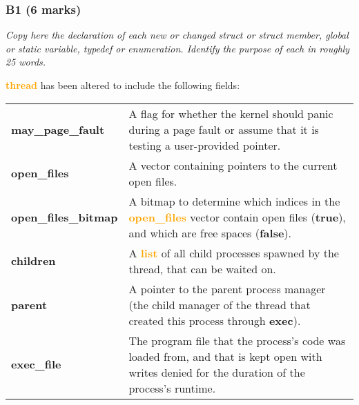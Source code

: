 \documentclass{report}
\newcommand{\question}[1]{\textit{#1} \ }
\newcommand{\fun}[1]{\textcolor{Emerald}{\textbf{#1}}}
\newcommand{\file}[1]{\textcolor{YellowGreen}{\textbf{#1}}}
\newcommand{\struct}[1]{\textcolor{orange}{\textbf{#1}}}
\newcommand{\var}[1]{\textcolor{RoyalPurple}{\textbf{#1}}}
\newcommand{\const}[1]{\textcolor{BrickRed}{\textbf{#1}}}
\newcommand{\pintoscode}[4]{}
\newcommand{\pintosfile}[3]{\pintoscode{#1}{#2}{\file{#3}}{#3}}
\begin{document}
            \subsubsection*{B1 (6 marks)}
                \question{Copy here the declaration of each new or changed struct or struct member, global or static variable, typedef or
                 enumeration. Identify the purpose of each in roughly 25 words.}

                \pintoscode{95}{134}{\file{thread.h}}{../threads/thread.h}
                \struct{thread} has been altered to include the following fields:
                \begin{center}
                    \begin{tabular}{l p{10cm}}
												\vspace*{2mm}
												\var{may\_page\_fault}    & A flag for whether the kernel should panic during a page fault or assume that it is testing a user-provided pointer. \\ \vspace*{2mm}
                        \var{open\_files}         & A vector containing pointers to the current open files. \\ \vspace*{2mm}
                        \var{open\_files\_bitmap} & A bitmap to determine which indices in the \struct{open\_files} vector contain open files (\const{true}), and which are free spaces (\const{false}). \\ \vspace*{2mm}
                        \var{children}            & A \struct{list} of all child processes spawned by the thread, that can be waited on. \\ \vspace*{2mm}
                        \var{parent}              & A pointer to the parent process manager (the child manager of the thread that created this process through \fun{exec}). \\ \vspace*{2mm}
                        \var{exec\_file}          & The program file that the process's code was loaded from, and that is kept open with writes denied for the duration of the process's runtime.
                    \end{tabular}
                \end{center}
                \pagebreak
                \pintosfile{12}{19}{process.h}
\end{document}
